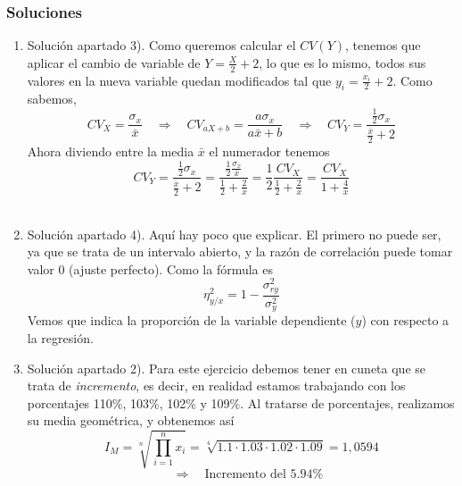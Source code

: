 \documentclass[fleqn]{article}
\def\next{\quad \Rightarrow \quad}
\begin{document}
\begin{enumerate}
\begin{enumerate}
                        \end{enumerate}


                \newpage

                \subsubsection{Soluciones}

                        \begin{enumerate}
                                \item Solución apartado 3). Como queremos calcular el $CV(Y)$, tenemos que aplicar el cambio de variable 
                                        de $Y = \frac{X}{2} + 2$, lo que es lo mismo, todos sus valores en la nueva variable quedan modificados tal que 
                                        $y_i = \frac{x_i}{2} + 2$. Como sabemos, 
                                        $$CV_X = \frac{\sigma_x}{\bar{x}} \next CV_{aX+b} = \frac{a\sigma_x}{a\bar{x} + b} \next CV_Y = \frac{\frac{1}{2}\sigma_x}{\frac{\bar{x}}{2} + 2}$$
                                        Ahora diviendo entre la media $\bar{x}$ el numerador tenemos
                                        $$CV_Y = \frac{\frac{1}{2}\sigma_x}{\frac{\bar{x}}{2} + 2} = \frac{\frac{1}{2}\frac{\sigma_x}{\bar{x}}}{\frac{1}{2} + \frac{2}{\bar{x}}} = 
                                        \frac{1}{2}\frac{CV_X}{\frac{1}{2} + \frac{2}{\bar{x}}} = \frac{CV_X}{1 + \frac{4}{\bar{x}}}$$ \\

                                \item Solución apartado 4). Aquí hay poco que explicar. El primero no puede ser, ya que se trata de un
                                        intervalo abierto, y la razón de correlación puede tomar valor 0 (ajuste perfecto). Como la fórmula es
                                        $$\eta^2_{y/x} = 1 - \frac{\sigma_{ry}^2}{\sigma_y^2}$$
                                        Vemos que indica la proporción de la variable dependiente ($y$) con respecto a la regresión.\\

                                \item Solución apartado 2). Para este ejercicio debemos tener en cuneta que se trata de \textit{incremento}, es decir,
                                        en realidad estamos trabajando con los porcentajes 110\%, 103\%, 102\% y 109\%. Al tratarse de porcentajes, realizamos su media 
                                        geométrica, y obtenemos así 
                                        $$I_M = \sqrt[n]{\prod_{i=1}^n x_i} = \sqrt[4]{1.1 \cdot 1.03 \cdot 1.02 \cdot 1.09} = 1,0594 $$
                                        $$\next \text{Incremento del }5.94\%$$\\


\end{enumerate}
\end{enumerate}
\end{document}
